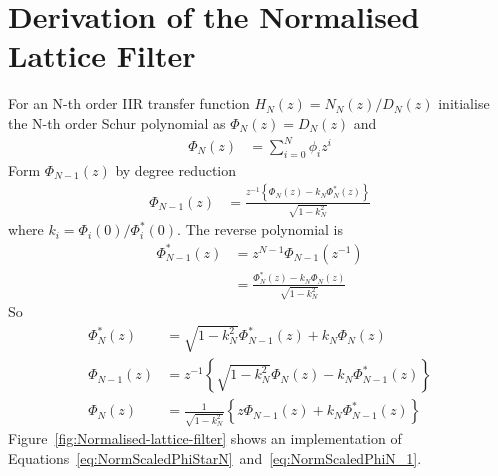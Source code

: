 \documentclass[a4paper,twoside,10pt,english]{report}
\begin{document}
\section{Derivation of the Normalised Lattice Filter }
For an N-th order IIR transfer function
$H_{N}\left(z\right)=N_{N}\left(z\right)/D_{N}\left(z\right)$
initialise the N-th order Schur polynomial as
$\Phi_{N}\left(z\right)=D_{N}\left(z\right)$
and
\begin{align*}
\Phi_{N}\left(z\right) & = \sum_{i=0}^{N}\phi_{i}z^{i}
\end{align*}
Form $\Phi_{N-1}\left(z\right)$ by degree reduction
\begin{align*}
\Phi_{N-1}\left(z\right) & = \frac{z^{-1}\left\{ \Phi_{N}\left(z\right)-k_{N}\Phi_{N}^{*}\left(z\right)\right\} }{\sqrt{1-k_{N}^{2}}}
\end{align*}
where $k_{i}=\Phi_{i}(0)/\Phi_{i}^{*}(0)$. The reverse polynomial
is
\begin{align*}
\Phi_{N-1}^{*}\left(z\right) & = z^{N-1}\Phi_{N-1}(z^{-1})\\
 & = \frac{\Phi_{N}^{*}\left(z\right)-k_{N}\Phi_{N}\left(z\right)}{\sqrt{1-k_{N}^{2}}}
\end{align*}
So 
\begin{align}
\Phi_{N}^{*}\left(z\right) & = \sqrt{1-k_{N}^{2}}\Phi_{N-1}^{*}\left(z\right)+k_{N}\Phi_{N}\left(z\right)\label{eq:NormScaledPhiStarN}\\
\Phi_{N-1}\left(z\right) & = z^{-1}\left\{ \sqrt{1-k_{N}^{2}}\Phi_{N}\left(z\right)-k_{N}\Phi_{N-1}^{*}\left(z\right)\right\} \\
\Phi_{N}\left(z\right) & = \frac{1}{\sqrt{1-k_{N}^{2}}}\left\{ z\Phi_{N-1}\left(z\right)+k_{N}\Phi_{N-1}^{*}\left(z\right)\right\} \label{eq:NormScaledPhiN_1}
\end{align}
Figure~\ref{fig:Normalised-lattice-filter} shows an implementation
of Equations~\ref{eq:NormScaledPhiStarN}~and~\ref{eq:NormScaledPhiN_1}. 
\end{document}
